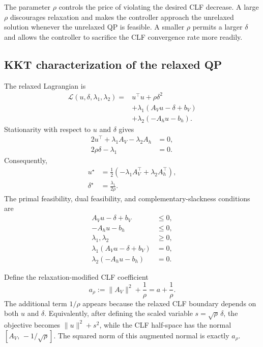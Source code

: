 \documentclass[../../master-handout.tex]{subfiles}
\begin{document}
The parameter $\rho$ controls the price of violating the desired CLF decrease. A large $\rho$ discourages relaxation and makes the controller approach the unrelaxed solution whenever the unrelaxed QP is feasible. A smaller $\rho$ permits a larger $\delta$ and allows the controller to sacrifice the CLF convergence rate more readily.

\subsection{KKT characterization of the relaxed QP}

The relaxed Lagrangian is
\begin{equation}
\begin{aligned}
    \mathcal{L}(u,\delta,\lambda_1,\lambda_2)
    ={}&
    u^\top u+\rho\delta^2
    \\
    &+
    \lambda_1(A_Vu-\delta+b_V)
    \\
    &+
    \lambda_2(-A_hu-b_h).
\end{aligned}
\label{eq:lec23-relaxed-lagrangian}
\end{equation}
Stationarity with respect to $u$ and $\delta$ gives
\begin{align}
    2u^\top+\lambda_1A_V-\lambda_2A_h&=0,
    \label{eq:lec23-relaxed-stationarity-u}
    \\
    2\rho\delta-\lambda_1&=0.
    \label{eq:lec23-relaxed-stationarity-delta}
\end{align}
Consequently,
\begin{align}
    u^\star
    &=
    \frac{1}{2}
    \left(
        -\lambda_1A_V^\top
        +
        \lambda_2A_h^\top
    \right),
    \label{eq:lec23-relaxed-u-lambda}
    \\
    \delta^\star
    &=
    \frac{\lambda_1}{2\rho}.
    \label{eq:lec23-relaxed-delta-lambda}
\end{align}
The primal feasibility, dual feasibility, and complementary-slackness conditions are
\begin{align}
    A_Vu-\delta+b_V&\leq 0,
    \\
    -A_hu-b_h&\leq 0,
    \\
    \lambda_1,\lambda_2&\geq 0,
    \\
    \lambda_1(A_Vu-\delta+b_V)&=0,
    \\
    \lambda_2(-A_hu-b_h)&=0.
\end{align}

Define the relaxation-modified CLF coefficient
\begin{equation}
    a_\rho
    :=
    \|A_V\|^2+\frac{1}{\rho}
    =
    a+\frac{1}{\rho}.
    \label{eq:lec23-arho}
\end{equation}
The additional term $1/\rho$ appears because the relaxed CLF boundary depends on both $u$ and $\delta$. Equivalently, after defining the scaled variable $s=\sqrt{\rho}\,\delta$, the objective becomes $\|u\|^2+s^2$, while the CLF half-space has the normal $\left[A_V,\,-1/\sqrt{\rho}\right]$. The squared norm of this augmented normal is exactly $a_\rho$.
\end{document}
